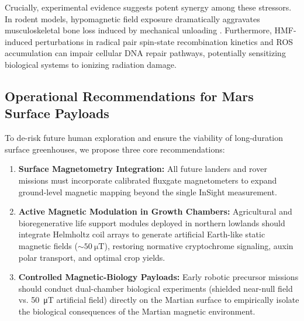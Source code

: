 Crucially, experimental evidence suggests potent synergy among these stressors. In rodent models, hypomagnetic field exposure dramatically aggravates musculoskeletal bone loss induced by mechanical unloading \citep{Xu2012, Mo2014}. Furthermore, HMF-induced perturbations in radical pair spin-state recombination kinetics and ROS accumulation \citep{Binhi2017, Hore2016} can impair cellular DNA repair pathways, potentially sensitizing biological systems to ionizing radiation damage.

\subsection{Operational Recommendations for Mars Surface Payloads}
To de-risk future human exploration and ensure the viability of long-duration surface greenhouses, we propose three core recommendations:
\begin{enumerate}
    \item \textbf{Surface Magnetometry Integration:} All future landers and rover missions must incorporate calibrated fluxgate magnetometers to expand ground-level magnetic mapping beyond the single InSight measurement.
    \item \textbf{Active Magnetic Modulation in Growth Chambers:} Agricultural and bioregenerative life support modules deployed in northern lowlands should integrate Helmholtz coil arrays to generate artificial Earth-like static magnetic fields ($\sim\SI{50}{\micro\tesla}$), restoring normative cryptochrome signaling, auxin polar transport, and optimal crop yields.
    \item \textbf{Controlled Magnetic-Biology Payloads:} Early robotic precursor missions should conduct dual-chamber biological experiments (shielded near-null field vs. \SI{50}{\micro\tesla} artificial field) directly on the Martian surface to empirically isolate the biological consequences of the Martian magnetic environment.
\end{enumerate}
